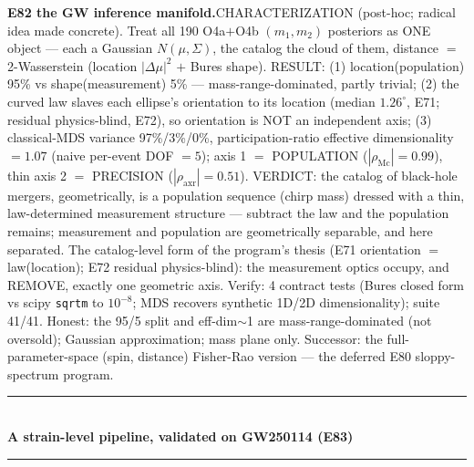 \documentclass[10pt]{article}
\newcommand{\entry}[2]{\vspace{5pt}\noindent\textbf{#1}\quad #2\par}
\newcommand{\grouphead}[1]{\vspace{9pt}\noindent\rule{\linewidth}{0.4pt}\\[-2pt]{\small\textbf{#1}}\\[-4pt]\rule{\linewidth}{0.4pt}\par\vspace{2pt}}
\begin{document}
\entry{E82 the GW inference manifold.}{CHARACTERIZATION (post-hoc; radical idea made concrete). Treat all
190 O4a$+$O4b $(m_1,m_2)$ posteriors as ONE object --- each a Gaussian $N(\mu,\Sigma)$, the catalog the
cloud of them, distance $=$ 2-Wasserstein (location $|\Delta\mu|^2$ $+$ Bures shape). RESULT: (1)
location(population) 95\% vs shape(measurement) 5\% --- mass-range-dominated, partly trivial; (2) the
curved law slaves each ellipse's orientation to its location (median $1.26^\circ$, E71; residual
physics-blind, E72), so orientation is NOT an independent axis; (3) classical-MDS variance 97\%/3\%/0\%,
participation-ratio effective dimensionality $=1.07$ (naive per-event DOF $=5$); axis 1 $=$ POPULATION
($|\rho_{\mathrm{Mc}}|=0.99$), thin axis 2 $=$ PRECISION ($|\rho_{\mathrm{axr}}|=0.51$). VERDICT: the
catalog of black-hole mergers, geometrically, is a population sequence (chirp mass) dressed with a thin,
law-determined measurement structure --- subtract the law and the population remains; measurement and
population are geometrically separable, and here separated. The catalog-level form of the program's thesis
(E71 orientation $=$ law(location); E72 residual physics-blind): the measurement optics occupy, and
REMOVE, exactly one geometric axis. Verify: 4 contract tests (Bures closed form vs scipy \texttt{sqrtm} to
$10^{-8}$; MDS recovers synthetic 1D/2D dimensionality); suite 41/41. Honest: the 95/5 split and
eff-dim$\sim$1 are mass-range-dominated (not oversold); Gaussian approximation; mass plane only. Successor:
the full-parameter-space (spin, distance) Fisher-Rao version --- the deferred E80 sloppy-spectrum program.}

\grouphead{A strain-level pipeline, validated on GW250114 (E83)}
\end{document}
